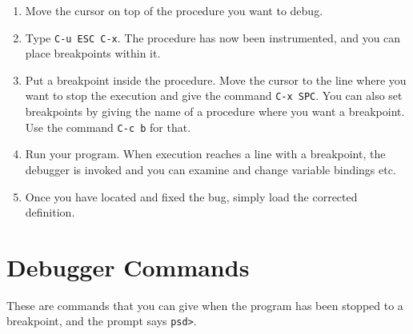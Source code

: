 \begin{enumerate}
\item
Move the cursor on top of the procedure you want to debug.

\item
Type {\tt C-u ESC C-x}.
The procedure has now been instrumented, and you can place breakpoints
within it.

\item
Put a breakpoint inside the procedure. Move the cursor to the line
where you want to stop the execution and give the command {\tt C-x
SPC}. You can also set breakpoints by giving the name of a procedure
where you want a breakpoint. Use the command {\tt C-c b} for that.

\item
Run your program. When execution reaches a line with a breakpoint, the
debugger is invoked and you can examine and change variable bindings
etc.

\item
Once you have located and fixed the bug, simply load the corrected
definition. 
\end{enumerate}

\section{Debugger Commands}

These are commands that you can give when the program has been stopped
to a breakpoint, and the prompt says \verb|psd>|.

